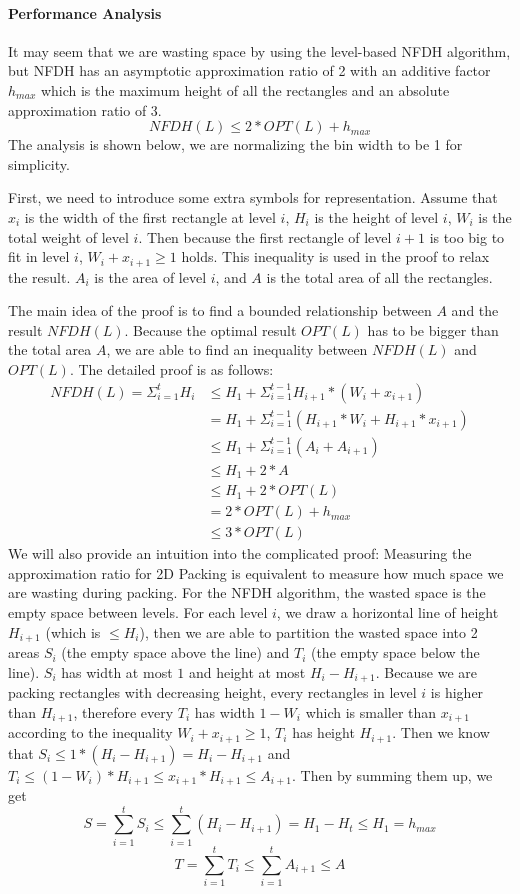 \documentclass[sigplan,screen,nonacm]{acmart}\settopmatter{printfolios=true,printccs=false,printacmref=false}
\begin{document}
\paragraph{Performance Analysis}
It may seem that we are wasting space by using the level-based NFDH algorithm, but NFDH has an asymptotic approximation ratio of 2 with an additive factor $h_{max}$ which is the maximum height of all the rectangles and an absolute approximation ratio of 3.
$$NFDH(L) \leq 2*OPT(L) + h_{max}$$
The analysis is shown below, we are normalizing the bin width to be 1 for simplicity.\par
First, we need to introduce some extra symbols for representation. Assume that $x_i$ is the width of the first rectangle at level $i$, $H_i$ is the height of level $i$, $W_i$ is the total weight of level $i$. Then because the first rectangle of level $i+1$ is too big to fit in level $i$, $W_{i} + x_{i+1} \geq 1$ holds. This inequality is used in the proof to relax the result. $A_i$ is the area of level $i$, and $A$ is the total area of all the rectangles. \par
The main idea of the proof is to find a bounded relationship between $A$ and the result $NFDH(L)$. Because the optimal result $OPT(L)$ has to be bigger than the total area $A$, we are able to find an inequality between $NFDH(L)$ and $OPT(L)$. The detailed proof is as follows:
\begin{align*}
  NFDH(L) = \Sigma_{i=1}^{t}H_i  &\leq H_1 + \Sigma_{i=1}^{t-1}H_{i+1}*(W_i + x_{i+1})\\
                & = H_1 + \Sigma_{i=1}^{t-1}(H_{i+1}*W_i + H_{i+1}*x_{i+1})\\
                & \leq H_1 + \Sigma_{i=1}^{t-1}(A_i + A_{i+1})\\
                & \leq H_1 + 2*A\\
                & \leq H_1 + 2*OPT(L)\\
                & = 2*OPT(L) + h_{max} \\
                & \leq 3*OPT(L)
\end{align*}
We will also provide an intuition into the complicated proof: Measuring the approximation ratio for 2D Packing is equivalent to measure how much space we are wasting during packing. For the NFDH algorithm, the wasted space is the empty space between levels. For each level $i$, we draw a horizontal line of height $H_{i+1}$ (which is $\leq H_i$), then we are able to partition the wasted space into 2 areas $S_i$ (the empty space above the line) and $T_i$ (the empty space below the line). $S_i$ has width at most $1$ and height at most $H_i - H_{i+1}$. Because we are packing rectangles with decreasing height, every rectangles in level $i$ is higher than $H_{i+1}$, therefore every $T_i$ has width $1-W_i$ which is smaller than $x_{i+1}$ according to the inequality $W_{i} + x_{i+1} \geq 1$, $T_i$ has height $H_{i+1}$. Then we know that $S_i \leq 1*(H_i - H_{i+1}) = H_i - H_{i+1}$ and $T_i \leq (1 - W_i)*H_{i+1} \leq x_{i+1}*H_{i+1} \leq A_{i+1}$. Then by summing them up, we get $$S = \sum_{i=1}^{t} S_{i} \leq \sum_{i=1}^{t} (H_i - H_{i+1}) = H_1 - H_t \leq H_1 = h_{max}$$ $$T = \sum_{i=1}^{t}T_i \leq \sum_{i=1}^{t}A_{i+1} \leq A$$
\end{document}
